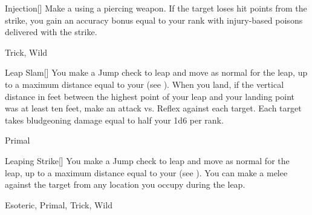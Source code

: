 \lowercase{\hypertarget{maneuver:Injection}{}}\label{maneuver:Injection}
\hypertarget{maneuver:Injection}{}
\begin{freeability}[Rank 3]{Injection}[]
Make a  using a piercing weapon.
If the target loses hit points from the strike, you gain an accuracy bonus equal to your rank with injury-based poisons delivered with the strike.


 Trick, Wild
\end{freeability}
\vspace{0.25em}



\lowercase{\hypertarget{maneuver:Leap Slam}{}}\label{maneuver:Leap Slam}
\hypertarget{maneuver:Leap Slam}{}
\begin{freeability}[Rank 3]{Leap Slam}[]
You make a Jump check to leap and move as normal for the leap, up to a maximum distance equal to your  (see ).
When you land, if the vertical distance in feet between the highest point of your leap and your landing point was at least ten feet, make an attack vs. Reflex against each target.
\hit Each target takes bludgeoning damage equal to half your  \add 1d6 per rank.


 Primal
\end{freeability}
\vspace{0.25em}



\lowercase{\hypertarget{maneuver:Leaping Strike}{}}\label{maneuver:Leaping Strike}
\hypertarget{maneuver:Leaping Strike}{}
\begin{freeability}[Rank 3]{Leaping Strike}[]
You make a Jump check to leap and move as normal for the leap, up to a maximum distance equal to your  (see ).
You can make a melee  against the target from any location you occupy during the leap.


 Esoteric, Primal, Trick, Wild
\end{freeability}
\vspace{0.25em}



